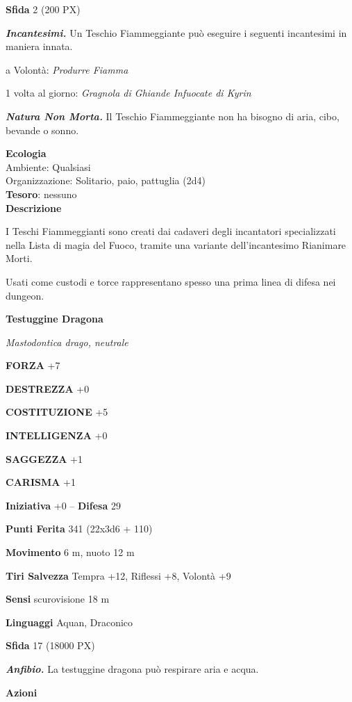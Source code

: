 \begin{multicols}{2}
	\textbf{Sfida} 2 (200 PX)

	\textit{\textbf{Incantesimi.}} Un Teschio Fiammeggiante può eseguire i seguenti incantesimi in maniera innata.

	a Volontà: \textit{Produrre Fiamma}

	1 volta al giorno: \textit{Gragnola di Ghiande Infuocate di Kyrin}

	\textit{\textbf{Natura Non Morta.}} Il Teschio Fiammeggiante non ha bisogno di aria, cibo, bevande o sonno.

	\textbf{Ecologia}\\
	Ambiente: Qualsiasi\\
	Organizzazione: Solitario, paio, pattuglia (2d4)\\
	\textbf{Tesoro}: nessuno\\

	\textbf{Descrizione}

	I Teschi Fiammeggianti sono creati dai cadaveri degli incantatori specializzati nella Lista di magia del Fuoco, tramite una variante dell'incantesimo Rianimare Morti.

	Usati come custodi e torce rappresentano spesso una prima linea di difesa nei dungeon.

	\medskip{}\textbf{Testuggine Dragona}

	\textit{Mastodontica drago, neutrale}

	\textbf{FORZA} +7

	\textbf{DESTREZZA} +0

	\textbf{COSTITUZIONE} +5

	\textbf{INTELLIGENZA} +0

	\textbf{SAGGEZZA} +1

	\textbf{CARISMA} +1

	\textbf{Iniziativa} +0 -- \textbf{Difesa} 29

	\textbf{Punti Ferita} 341 (22x3d6 + 110)

	\textbf{Movimento} 6 m, nuoto 12 m

	\textbf{Tiri Salvezza} Tempra +12, Riflessi +8, Volontà +9

	\textbf{Sensi} scurovisione 18 m

	\textbf{Linguaggi} Aquan, Draconico

	\textbf{Sfida} 17 (18000 PX)

	\textit{\textbf{Anfibio.}} La testuggine dragona può respirare aria e acqua.

	\textbf{Azioni}


\end{multicols}

